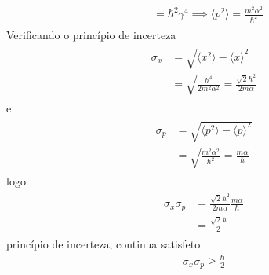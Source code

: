 \begin{prob}
\begin{sol}
\begin{enumerate}[label=\alph *)]
\begin{align}
\begin{split}
																		&= \hbar^{2} \gamma^{4}\implies{\boxed{\langle p^{2} \rangle=\frac{m^{2} \alpha^{2}}{\hbar^{2}}}}
						\end{split}
					\end{align}
					Verificando o princípio de incerteza
					\begin{align}
							\begin{split}
								\sigma_{x} &= \sqrt{\langle x^{2} \rangle-\langle x \rangle^{2}}\\
													 &=\sqrt{\frac{h^{4}}{2m^{2} \alpha^{2}}}=\frac{\sqrt{2}\hbar^{2}}{2m \alpha}
							\end{split}
					\end{align}
					e
					\begin{align}
							\begin{split}
								\sigma_{p} &= \sqrt{\langle p^{2} \rangle-\langle p \rangle^{2}}\\
													 &=\sqrt{\frac{m^{2} \alpha^{2}}{\hbar^{2}}}=\frac{m \alpha}{\hbar}
							\end{split}
					\end{align}
					logo
					\begin{align}
							\begin{split}
								\sigma_{x} \sigma_{p} &= \frac{\sqrt{2}\hbar^{2}}{2m \alpha}\frac{m \alpha}{\hbar}\\
																			&= \frac{\sqrt{2}\hbar}{2}
							\end{split}
					\end{align}
					 princípio de incerteza, continua satisfeto
					 \begin{align}
					 		\boxed{
								\sigma_{x} \sigma_{p} \geq \frac{\hbar}{2}
							}
					 \end{align}
		\end{enumerate}
	\end{sol}
\end{prob}
